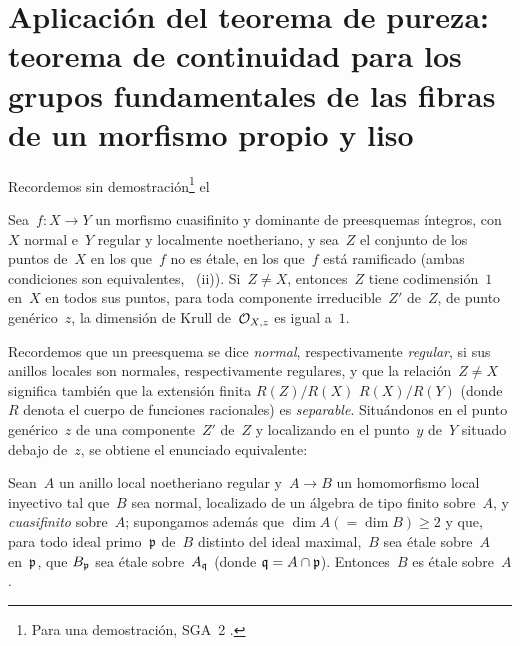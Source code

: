 \section[Aplicación del teorema de pureza]{Aplicación del teorema de pureza:
teorema de continuidad para los grupos fundamentales de las fibras de un
morfismo propio y liso}
\label{X.3}

Recordemos sin demostración\footnote{Para una demostración, \cf SGA~2
.} el

\begin{theoremedepurete}
\label{X.3.1}
%
Sea~$f\colon X\to Y$ un morfismo cuasifinito y dominante de preesquemas
íntegros, con~$X$ normal e~$Y$ regular y localmente noetheriano, y sea~$Z$ el
conjunto de los puntos de~$X$ en los que~$f$ no es étale, \ie en los que~$f$
está ramificado (ambas condiciones son equivalentes,
\textup{~(ii)}). Si~$Z\ne X$, entonces~$Z$ tiene codimensión~$1$
en~$X$ en todos sus puntos, \ie para toda componente irreducible~$Z'$ de~$Z$, de
punto genérico~$z$, la dimensión de Krull de~$\cal{O}_{X,z}$ es igual a~$1$.
\end{theoremedepurete}

Recordemos que un preesquema se dice \emph{normal}, respectivamente
\emph{regular}, si sus anillos locales son normales, respectivamente regulares,
y que la relación~$Z\ne X$ significa también que la extensión finita
{$R(Z)/R(X)$}
{$R(X)/R(Y)$}
(donde~$R$ denota el cuerpo de funciones racionales) es \emph{separable}.
Situándonos en el punto genérico~$z$ de una componente~$Z'$ de~$Z$ y
localizando en el punto~$y$ de~$Y$ situado debajo de~$z$, se obtiene
el enunciado equivalente:

\begin{corollaire}
\label{X.3.2}
Sean~$A$ un anillo local noetheriano regular y~$A\to B$ un homomorfismo local
inyectivo tal que~$B$ sea normal, localizado de un álgebra de tipo finito
sobre~$A$, y \emph{cuasifinito} sobre~$A$; supongamos además que
$\dim A (=\dim B)\ge 2$ y que, para todo ideal primo~$\goth{p}$ de~$B$
distinto del ideal maximal,~$B$ sea étale sobre~$A$ en~$\goth{p}$, \ie que
$B_\goth{p}$ sea étale sobre~$A_\goth{q}$ (donde
$\goth{q}=A\cap\goth{p}$). Entonces~$B$ es étale sobre~$A$.
\end{corollaire}


